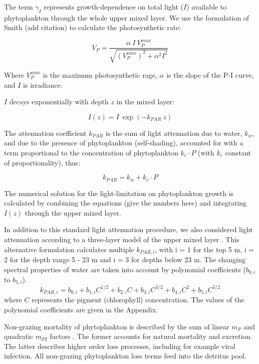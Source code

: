 \documentclass[journal abbreviation, manuscript]{copernicus}
\begin{document}
The term $\gamma_{I}$ represents growth-dependence on total light ($I$) available to phytoplankton through the whole upper mixed layer. We use the formulation of Smith (add citation) to calculate the photosynthetic rate:

\begin{equation}
    V_P = \frac{\alpha ~ I ~ V_P^{max}}{\sqrt{(V_P^{max})^2 + \alpha^2 I^2}}
\end{equation}

Where $V_P^{max}$ is the maximum photosynthetic rage, $\alpha$ is the slope of the P-I curve, and $I$ is irradiance.

$I$ decays exponentially with depth $z$ in the mixed layer:

\begin{equation}
    I(z) = I \ \exp{(-k_{PAR} \ z)}
\end{equation}

The attenuation coefficient $k_{PAR}$ is the sum of light attenuation due to water, $k_w$, and due to the presence of phytoplankton (self-shading), accounted for with a term proportional to the concentration of phytoplankton $k_c \cdot P$ (with $k_c$ constant of proportionality), thus:

\begin{equation}
    k_{PAR} = k_w + k_c \cdot P
\end{equation}

The numerical solution for the light-limitation on phytoplankton growth is calculated by combining the equations (give the numbers here) and integrating $I(z)$ through the upper mixed layer.

In addition to this standard light attenuation procedure, we also considered light attenuation according to a three-layer model of the upper mixed layer  \citep{Anderson1993APhotosynthesis}. This alternative formulation calculates multiple $k_{PAR, i}$, with i = 1 for the top 5 \unit{m}, i = 2 for the depth range 5 - 23 \unit{m} and i = 3 for depths below 23 \unit{m}. The changing spectral properties of water are taken into account by polynomial coefficients ($b_{0,i}$ to $b_{5,i}$).
\begin{equation}
    k_{PAR, i} = b_{0,i} + b_{1,i} C^{1/2} + b_{2,i} C + b_{3,i} C^{3/2} + b_{4,i} C^2 + b_{5,i} C^{5/2}
\end{equation}
where $C$ represents the pigment (chlorophyll) concentration. The values of the polynomial coefficients are given in the Appendix.

Non-grazing mortality of phytoplankton is described by the sum of linear $m_P$ and quadratic $m_{P2}$ factors \citep{Yool2011Medusa-1.0:Domain}. The former accounts for natural mortality and excretion. The latter describes higher order loss processes, including for example viral infection. All non-grazing phytoplankton loss terms feed into the detritus pool.
\end{document}
